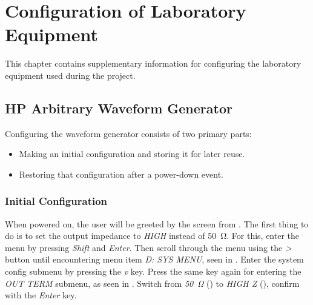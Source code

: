 \chapter{Configuration of Laboratory Equipment}
\label{chap:labconfig}

This chapter contains supplementary information for configuring the laboratory
equipment used during the project.

\section{HP Arbitrary Waveform Generator}
\label{sec:HPwave}

Configuring the waveform generator consists of two primary parts:

\begin{itemize}\tightlist
    \item
        Making an initial configuration and storing it for later reuse.
    \item
        Restoring that configuration after a power-down event.
\end{itemize}

\subsection{Initial Configuration}
\label{subsec:HPwave:initialConfig}

When   powered  on,   the   user  will   be  greeted   by   the  screen   from
. The  first  thing  to  do  is  to  set  the  output
impedance  to  \emph{HIGH}  instead  of  \SI{50}{\ohm}. For  this,  enter  the
menu  by  pressing  \emph{Shift}  and \emph{Enter}. Then  scroll  through  the
menu  using the  \emph{>}  button until  encountering  menu item  \emph{D: SYS
MENU},  seen in  . Enter  the  system config  submenu
by  pressing  the  \emph{v}  key. Press   the  same  key  again  for  entering
the  \emph{OUT TERM}  submenu,  as  seen in  . Switch
from   \emph{\SI{50}{\ohm}}   ()   to   \emph{HIGH   Z}
(), confirm with the \emph{Enter} key.

